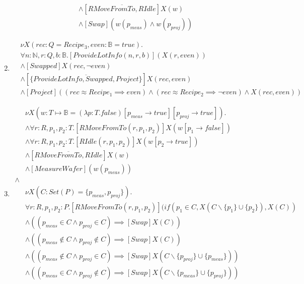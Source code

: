 \begin{enumerate}
\begin{align*}
            &\wedge [\overline{RMoveFromTo, RIdle}]X(w)\\
            &\wedge [Swap](w(p_\textit{meas}) \wedge w(p_\textit{proj}))
        \end{align*}
    \item \begin{align*}
    	&\nu X(rec:Q = Recipe_3, even:\mathbb{B} = true).\\
  		&\forall n:\mathbb{N}, r:Q, b:\mathbb{B}.[ProvideLotInfo(n,r,b)](X(r,even))\\
  		&\wedge [Swapped]X(rec, \lnot even)\\
  		&\wedge [\overline{\{ProvideLotInfo, Swapped, Project\}}]X(rec, even)\\
  		&\wedge [Project]((rec \approx Recipe_1 \implies even) \wedge (rec \approx Recipe_2 \implies \lnot even) \wedge X(rec, even))
    \end{align*}
    \item \begin{align*}
            &\nu X(w:T\mapsto \mathbb{B} = (\lambda p:T.false)[p_\mathit{meas} \rightarrow true][p_\mathit{proj} \rightarrow true]). \\
            &\wedge \forall r:R, p_1,p_2 :T.[RMoveFromTo(r, p_1,p_2)]X(w[p_1\rightarrow false])\\
            &\wedge \forall r:R, p_1,p_2 :T.[RIdle(r, p_1,p_2)]X(w[p_2\rightarrow true])\\
            &\wedge [\overline{RMoveFromTo, RIdle}]X(w)\\
            &\wedge [MeasureWafer](w(p_\textit{meas}))\\
            \wedge\\
            &\nu X(C : Set(P) = \{p_\mathit{meas},p_\mathit{proj}\}).\\
            & \forall r:R, p_1, p_2 : P . [RMoveFromTo(r, p_1, p_2)](if(p_1 \in C, X(C\backslash\{p_1\}\cup\{p_2\}), X(C))\\
            &\wedge ((p_\mathit{meas} \in C \wedge p_\mathit{proj} \in C) \implies [Swap]X(C))\\
            &\wedge ((p_\mathit{meas} \notin C \wedge p_\mathit{proj} \notin C) \implies [Swap]X(C))\\
            &\wedge ((p_\mathit{meas} \notin C \wedge p_\mathit{proj} \in C) \implies [Swap]X(C\backslash\{p_\mathit{proj}\} \cup \{p_\mathit{meas}\}))\\
            &\wedge ((p_\mathit{meas} \in C \wedge p_\mathit{proj} \notin C) \implies [Swap]X(C\backslash\{p_\mathit{meas}\} \cup \{p_\mathit{proj}\}))\\

\end{align*}
\end{enumerate}
